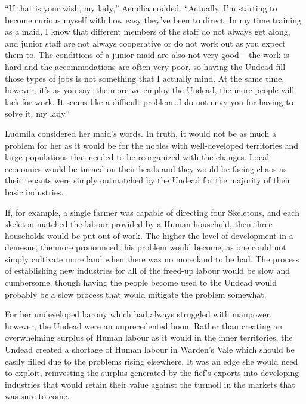  

“If that is your wish, my lady,” Aemilia nodded. “Actually, I’m starting to become curious myself with how easy they’ve been to direct. In my time training as a maid, I know that different members of the staff do not always get along, and junior staff are not always cooperative or do not work out as you expect them to. The conditions of a junior maid are also not very good – the work is hard and the accommodations are often very poor, so having the Undead fill those types of jobs is not something that I actually mind. At the same time, however, it’s as you say: the more we employ the Undead, the more people will lack for work. It seems like a difficult problem…I do not envy you for having to solve it, my lady.”

 

Ludmila considered her maid’s words. In truth, it would not be as much a problem for her as it would be for the nobles with well-developed territories and large populations that needed to be reorganized with the changes. Local economies would be turned on their heads and they would be facing chaos as their tenants were simply outmatched by the Undead for the majority of their basic industries.

 

If, for example, a single farmer was capable of directing four Skeletons, and each skeleton matched the labour provided by a Human household, then three households would be put out of work. The higher the level of development in a demesne, the more pronounced this problem would become, as one could not simply cultivate more land when there was no more land to be had. The process of establishing new industries for all of the freed-up labour would be slow and cumbersome, though having the people become used to the Undead would probably be a slow process that would mitigate the problem somewhat.

 

For her undeveloped barony which had always struggled with manpower, however, the Undead were an unprecedented boon. Rather than creating an overwhelming surplus of Human labour as it would in the inner territories, the Undead created a shortage of Human labour in Warden’s Vale which should be easily filled due to the problems rising elsewhere. It was an edge she would need to exploit, reinvesting the surplus generated by the fief’s exports into developing industries that would retain their value against the turmoil in the markets that was sure to come.


